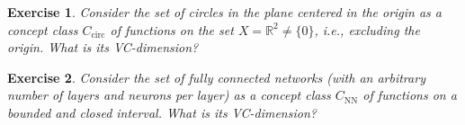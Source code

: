 \documentclass{article}
\newcommand{\R}{\mathbb{R}}
\newtheorem{exercise}{Exercise}
\begin{document}
\begin{exercise}
    Consider the set of circles in the plane centered in the origin as a concept class $C_{\mathrm{circ}}$ of functions on the set $X= \R^2 \neq \{0\}$, i.e., excluding the origin. What is its VC-dimension?
\end{exercise}

\begin{exercise}
    Consider the set of fully connected networks (with an arbitrary number of layers and neurons per layer) as a concept class $C_{\mathrm{NN}}$ of functions on a bounded and closed interval. What is its VC-dimension?
\end{exercise}




\end{document}
